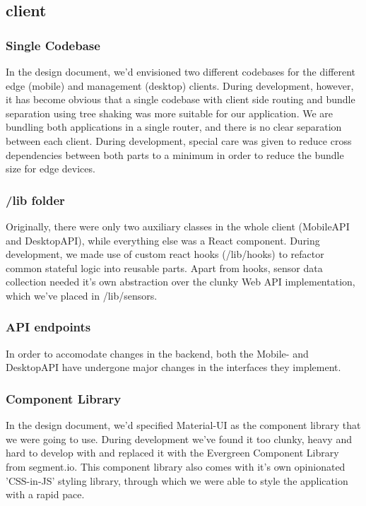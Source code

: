 \subsection{client}
\subsubsection{Single Codebase}
In the design document, we'd envisioned two different codebases for the different edge (mobile) and management (desktop) clients. During development, however, it has become obvious that a single codebase with client side routing and bundle separation using tree shaking was more suitable for our application. We are bundling both applications in a single router, and there is no clear separation between each client. During development, special care was given to reduce cross dependencies between both parts to a minimum in order to reduce the bundle size for edge devices.

\subsubsection{/lib folder}
Originally, there were only two auxiliary classes in the whole client (MobileAPI and DesktopAPI), while everything else was a React component. During development, we made use of custom react hooks (/lib/hooks) to refactor common stateful logic into reusable parts. Apart from hooks, sensor data collection needed it's own abstraction over the clunky Web API implementation, which we've placed in /lib/sensors.

\subsubsection{API endpoints}
In order to accomodate changes in the backend, both the Mobile- and DesktopAPI have undergone major changes in the interfaces they implement.

\subsubsection{Component Library}
In the design document, we'd specified Material-UI as the component library that we were going to use. During development we've found it too clunky, heavy and hard to develop with and replaced it with the Evergreen Component Library from segment.io. This component library also comes with it's own opinionated 'CSS-in-JS' styling library, through which we were able to style the application with a rapid pace.


